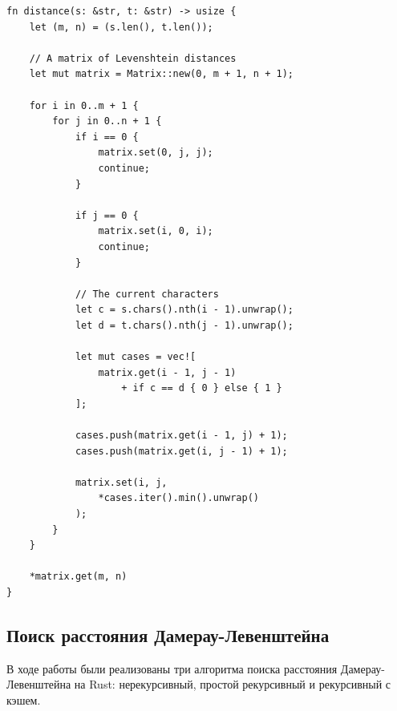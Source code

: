 \documentclass{report}
\begin{document}
\begin{lstlisting}[caption=Реализация нерекурсивного алгоритма]
fn distance(s: &str, t: &str) -> usize {
    let (m, n) = (s.len(), t.len());

    // A matrix of Levenshtein distances
    let mut matrix = Matrix::new(0, m + 1, n + 1);

    for i in 0..m + 1 {
        for j in 0..n + 1 {
            if i == 0 {
                matrix.set(0, j, j);
                continue;
            }

            if j == 0 {
                matrix.set(i, 0, i);
                continue;
            }

            // The current characters
            let c = s.chars().nth(i - 1).unwrap();
            let d = t.chars().nth(j - 1).unwrap();

            let mut cases = vec![
                matrix.get(i - 1, j - 1)
                    + if c == d { 0 } else { 1 }
            ];

            cases.push(matrix.get(i - 1, j) + 1);
            cases.push(matrix.get(i, j - 1) + 1);

            matrix.set(i, j,
                *cases.iter().min().unwrap()
            );
        }
    }

    *matrix.get(m, n)
}
\end{lstlisting}

\subsection{Поиск расстояния Дамерау-Левенштейна}

В ходе работы были реализованы три алгоритма поиска расстояния
Дамерау-Левенштейна на Rust: нерекурсивный, простой рекурсивный и
рекурсивный с кэшем.
\end{document}
